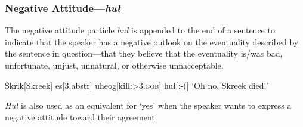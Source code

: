 \documentclass[10pt]{article}
\newcommand{\sk}{\textsc}
\newcommand{\vS}{Š}
\begin{document}
\subsubsection{Negative Attitude---\textit{hu\l}}

The negative attitude particle \textit{hu\l} is appended to the end of a sentence to indicate that the speaker has a negative outlook on the eventuality described by the sentence in question---that they believe that the eventuality is/was bad, unfortunate, unjust, unnatural, or otherwise unnacceptable.

\ex 
\begingl
\vS krik[Skreek]
es[\sc 3.abstr]
uheog[kill:\sk{>3.gob}]
hu\l[:-{(}]
\glft `Oh no, Skreek died!'
\endgl
\xe

\textit{Hu\l} is also used as an equivalent for `yes' when the speaker wants to express a negative attitude toward their agreement.

\end{document}
